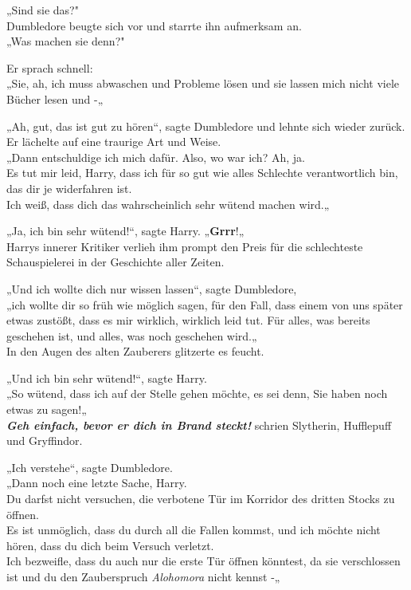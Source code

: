 {„Sind sie das?"\\ Dumbledore beugte sich vor und starrte ihn aufmerksam an.\\ „Was machen sie denn?"

Er sprach schnell:\\ „Sie, ah, ich muss abwaschen und Probleme lösen und sie lassen mich nicht viele Bücher lesen und -„

„Ah, gut, das ist gut zu hören“, sagte Dumbledore und lehnte sich wieder zurück.\\ Er lächelte auf eine traurige Art und Weise.\\ „Dann entschuldige ich mich dafür. Also, wo war ich? Ah, ja.\\ Es tut mir leid, Harry, dass ich für so gut wie alles Schlechte verantwortlich bin, das dir je widerfahren ist.\\ Ich weiß, dass dich das wahrscheinlich sehr wütend machen wird.„

„Ja, ich bin sehr wütend!“, sagte Harry. „\textbf{Grrr}!„\\ Harrys innerer Kritiker verlieh ihm prompt den Preis für die schlechteste Schauspielerei in der Geschichte aller Zeiten.

„Und ich wollte dich nur wissen lassen“, sagte Dumbledore,\\ „ich wollte dir so früh wie möglich sagen, für den Fall, dass einem von uns später etwas zustößt, dass es mir wirklich, wirklich leid tut. Für alles, was bereits geschehen ist, und alles, was noch geschehen wird.„\\ In den Augen des alten Zauberers glitzerte es feucht.

„Und ich bin sehr wütend!“, sagte Harry.\\ „So wütend, dass ich auf der Stelle gehen möchte, es sei denn, Sie haben noch etwas zu sagen!„\\ \textbf{\emph{Geh einfach, bevor er dich in Brand steckt!}} schrien Slytherin, Hufflepuff und Gryffindor.

„Ich verstehe“, sagte Dumbledore.\\ „Dann noch eine letzte Sache, Harry.\\ Du darfst nicht versuchen, die verbotene Tür im Korridor des dritten Stocks zu öffnen.\\ Es ist unmöglich, dass du durch all die Fallen kommst, und ich möchte nicht hören, dass du dich beim Versuch verletzt.\\ Ich bezweifle, dass du auch nur die erste Tür öffnen könntest, da sie verschlossen ist und du den Zauberspruch \emph{Alohomora} nicht kennst -„

}
